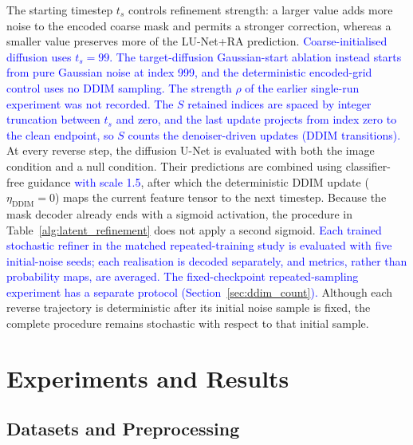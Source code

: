\documentclass[jimaging,article,submit,pdftex,moreauthors]
  {Definitions/mdpi}
\DeclareRobustCommand{\rev}[1]{\textcolor{blue}{#1}}
\DeclareRobustCommand{\rev}[1]{#1}
\providecommand{\linelabel}[1]{}
\newcommand{\seclabel}[1]{\linelabel{rev:sec:#1}}
\newcommand{\secend}[1]{\linelabel{rev:end:#1}}
\begin{document}
The starting timestep $t_s$ controls refinement strength: a larger value adds more noise to the encoded coarse mask and permits a stronger correction, whereas a smaller value preserves more of the LU-Net+RA prediction. \rev{Coarse-initialised diffusion uses $t_s=99$. The target-diffusion Gaussian-start ablation instead starts from pure Gaussian noise at index 999, and the deterministic encoded-grid control uses no DDIM sampling. The strength $\rho$ of the earlier single-run experiment was not recorded. The $S$ retained indices are spaced by integer truncation between $t_s$ and zero, and the last update projects from index zero to the clean endpoint, so $S$ counts the denoiser-driven updates (DDIM transitions).} At every reverse step, the diffusion U-Net is evaluated with both the image condition and a null condition. Their predictions are combined using classifier-free guidance\rev{ with scale 1.5}, after which the deterministic DDIM update ($\eta_{\mathrm{DDIM}}=0$) maps the current feature tensor to the next timestep. Because the mask decoder already ends with a sigmoid activation, the procedure in Table~\ref{alg:latent_refinement} does not apply a second sigmoid. \rev{Each trained stochastic refiner in the matched repeated-training study is evaluated with five initial-noise seeds; each realisation is decoded separately, and metrics, rather than probability maps, are averaged. The fixed-checkpoint repeated-sampling experiment has a separate protocol (Section~\ref{sec:ddim_count}).} Although each reverse trajectory is deterministic after its initial noise sample is fixed, the complete procedure remains stochastic with respect to that initial sample.\secend{ddim_sampling}


\section{Experiments and Results}
\label{sec:experiments_results}

\subsection{Datasets and Preprocessing}
\label{sec:datasets}
\seclabel{datasets}
\end{document}
